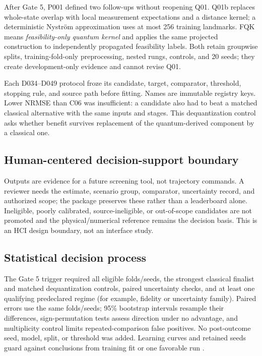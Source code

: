 After Gate 5, P001 defined two follow-ups without reopening Q01. Q01b replaces
whole-state overlap with local measurement expectations and a distance kernel;
a deterministic Nystr\"om approximation uses at most 256 training landmarks.
FQK means \emph{feasibility-only quantum kernel} and applies the same projected
construction to independently propagated feasibility labels. Both retain
groupwise splits, training-fold-only preprocessing, nested rungs, controls, and
20 seeds; they create development-only evidence and cannot revise Q01.

Each D034--D049 protocol froze its candidate, target, comparator, threshold,
stopping rule, and source path before fitting. Names are immutable registry
keys. Lower NRMSE than C06 was insufficient: a candidate also had to beat a
matched classical alternative with the same inputs and stages. This
dequantization control asks whether benefit survives replacement of the
quantum-derived component by a classical one.

\subsection{Human-centered decision-support boundary}

Outputs are evidence for a future screening tool, not trajectory commands. A
reviewer needs the estimate, scenario group, comparator, uncertainty record,
and authorized scope; the package preserves these rather than a leaderboard
alone. Ineligible, poorly calibrated, source-ineligible, or out-of-scope
candidates are not promoted and the physical/numerical reference remains the
decision basis. This is an HCI design boundary, not an interface study.

\subsection{Statistical decision process}

The Gate 5 trigger required all eligible folds/seeds, the strongest classical
finalist and matched dequantization controls, paired uncertainty checks, and at
least one qualifying predeclared regime (for example, fidelity or uncertainty
family). Paired errors use the same folds/seeds; 95\% bootstrap intervals
resample their differences, sign-permutation tests assess direction under no
advantage, and multiplicity control limits repeated-comparison false positives.
No post-outcome seed, model, split, or threshold was added. Learning curves and
retained seeds guard against conclusions from training fit or one favorable run
\cite{peters2023,grant2019}.


